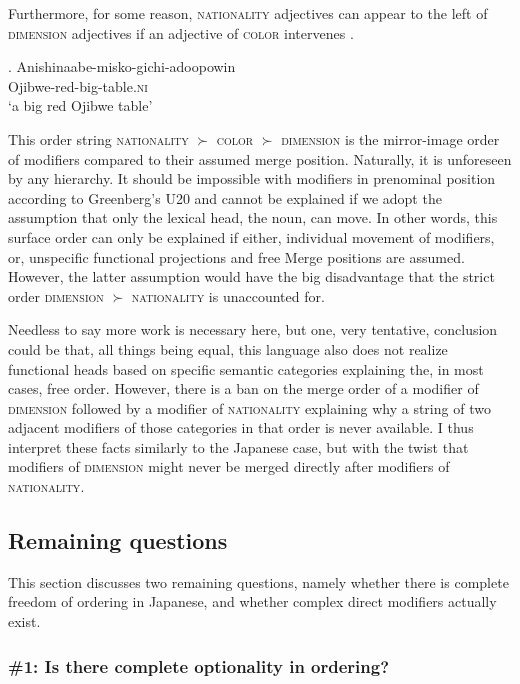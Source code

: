 Furthermore, for some reason, \textsc{nationality} adjectives can appear to the left of \textsc{dimension} adjectives if an adjective of \textsc{color} intervenes \citep[162]{rosen:2016:on}.

\exg. Anishinaabe-misko-gichi-adoopowin\\
Ojibwe-red-big-table.\textsc{ni}\\
`a big red Ojibwe table’ \null \hfill \citep[162]{rosen:2016:on}

This order string \textsc{nationality} $\succ$ \textsc{color} $\succ$ \textsc{dimension} is the mirror-image order of modifiers compared to their assumed merge position. Naturally, it is unforeseen by any hierarchy. It should be impossible with modifiers in prenominal position according to Greenberg’s U20 and cannot be explained if we adopt the assumption that only the lexical head, the noun, can move. In other words, this surface order can only be explained if either, individual movement of modifiers, or, unspecific functional projections and free Merge positions are assumed. However, the latter assumption would have the big disadvantage that the strict order \textsc{dimension} $\succ$ \textsc{nationality} is unaccounted for. 

Needless to say more work is necessary here, but one, very tentative, conclusion could be that, all things being equal, this language also does not realize functional heads based on specific semantic categories explaining the, in most cases, free order. However, there is a ban on the merge order of a modifier of \textsc{dimension} followed by a modifier of \textsc{nationality}  explaining why a string of two adjacent modifiers of those categories in that order is never available. I thus interpret these facts similarly to the Japanese case, but with the twist that modifiers of \textsc{dimension} might never be merged directly after modifiers of \textsc{nationality}.

\subsection{Remaining questions}

This section discusses two remaining questions, namely whether there is complete freedom of ordering in Japanese, and whether complex direct modifiers actually exist.

\subsubsection{\#1: Is there complete optionality in ordering?} \label{optionality}

